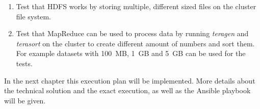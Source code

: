 \begin{enumerate}
\begin{enumerate}
            \item Test that \ac{HDFS} works by storing multiple, different sized files on the cluster file system.
            \item Test that MapReduce can be used to process data by running \emph{teragen} and \emph{terasort} on the cluster to create different amount of numbers and sort them. For example datasets with 100~\ac{MB}, 1~\ac{GB} and 5~\ac{GB} can be used for the tests.
        \end{enumerate}

\end{enumerate}

In the next chapter this execution plan will be implemented. More details about the technical solution and the exact execution, as well as the Ansible playbook will be given.



